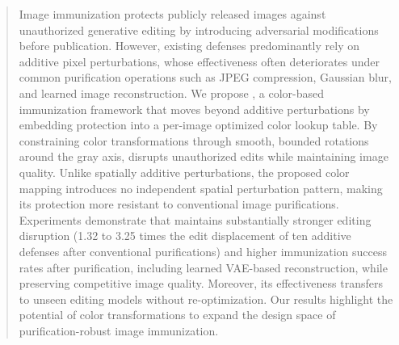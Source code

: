 \begin{abstract}
Image immunization protects publicly released images against unauthorized generative editing by introducing adversarial modifications before publication. However, existing defenses predominantly rely on additive pixel perturbations, whose effectiveness often deteriorates under common purification operations such as JPEG compression, Gaussian blur, and learned image reconstruction. We propose \capg{}, a color-based immunization framework that moves beyond additive perturbations by embedding protection into a per-image optimized color lookup table. By constraining color transformations through smooth, bounded rotations around the gray axis, \capg{} disrupts unauthorized edits while maintaining image quality. Unlike spatially additive perturbations, the proposed color mapping introduces no independent spatial perturbation pattern, making its protection more resistant to conventional image purifications. Experiments demonstrate that \capg{} maintains substantially stronger editing disruption (1.32 to 3.25 times the edit displacement of ten additive defenses after conventional purifications) and higher immunization success rates after purification, including learned VAE-based reconstruction, while preserving competitive image quality. Moreover, its effectiveness transfers to unseen editing models without re-optimization. Our results highlight the potential of color transformations to expand the design space of purification-robust image immunization.

\end{abstract}

